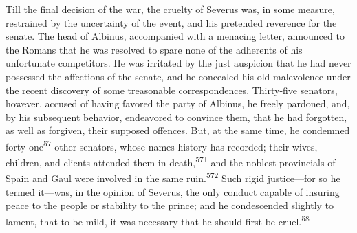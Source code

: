 Till the final decision of the war, the cruelty of Severus was,
in some measure, restrained by the uncertainty of the event, and
his pretended reverence for the senate. The head of Albinus,
accompanied with a menacing letter, announced to the Romans that
he was resolved to spare none of the adherents of his unfortunate
competitors. He was irritated by the just auspicion that he had
never possessed the affections of the senate, and he concealed
his old malevolence under the recent discovery of some
treasonable correspondences. Thirty-five senators, however,
accused of having favored the party of Albinus, he freely
pardoned, and, by his subsequent behavior, endeavored to convince
them, that he had forgotten, as well as forgiven, their supposed
offences. But, at the same time, he condemned forty-one\textsuperscript{57} other
senators, whose names history has recorded; their wives,
children, and clients attended them in death,\textsuperscript{571} and the noblest
provincials of Spain and Gaul were involved in the same ruin.\textsuperscript{572}
Such rigid justice—for so he termed it—was, in the opinion of
Severus, the only conduct capable of insuring peace to the people
or stability to the prince; and he condescended slightly to
lament, that to be mild, it was necessary that he should first be
cruel.\textsuperscript{58}




